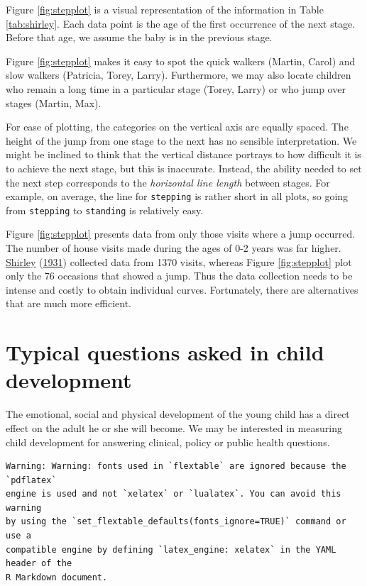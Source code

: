 \documentclass[
]{book}
\begin{document}
Figure \ref{fig:stepplot} is a visual representation of the information in Table \ref{tab:shirley}. Each data point is the age of the first occurrence of the next stage. Before that age, we assume the baby is in the previous stage.

Figure \ref{fig:stepplot} makes it easy to spot the quick walkers (Martin, Carol) and slow walkers (Patricia, Torey, Larry). Furthermore, we may also locate children who remain a long time in a particular stage (Torey, Larry) or who jump over stages (Martin, Max).

For ease of plotting, the categories on the vertical axis are equally spaced. The height of the jump from one stage to the next has no sensible interpretation. We might be inclined to think that the vertical distance portrays to how difficult it is to achieve the next stage, but this is inaccurate. Instead, the ability needed to set the next step corresponds to the \emph{horizontal line length} between stages. For example, on average, the line for \texttt{stepping} is rather short in all plots, so going from \texttt{stepping} to \texttt{standing} is relatively easy.

Figure \ref{fig:stepplot} presents data from only those visits where a jump occurred. The number of house visits made during the ages of 0-2 years was far higher. \protect\hyperlink{ref-shirley1931}{Shirley} (\protect\hyperlink{ref-shirley1931}{1931}) collected data from 1370 visits, whereas Figure \ref{fig:stepplot} plot only the 76 occasions that showed a jump. Thus the data collection needs to be intense and costly to obtain individual curves. Fortunately, there are alternatives that are much more efficient.

\hypertarget{sec:questions}{%
\section{Typical questions asked in child development}\label{sec:questions}}

The emotional, social and physical development of the young child has a direct effect on the adult he or she will become. We may be interested in measuring child development for answering clinical, policy or public health questions.

\begin{verbatim}
Warning: Warning: fonts used in `flextable` are ignored because the `pdflatex`
engine is used and not `xelatex` or `lualatex`. You can avoid this warning
by using the `set_flextable_defaults(fonts_ignore=TRUE)` command or use a
compatible engine by defining `latex_engine: xelatex` in the YAML header of the
R Markdown document.
\end{verbatim}
\end{document}
